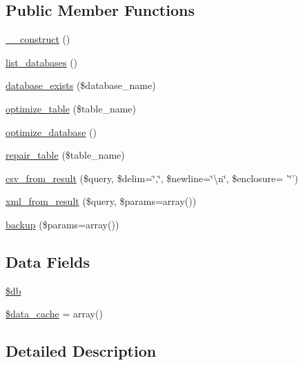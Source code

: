 \subsection*{Public Member Functions}
\begin{DoxyCompactItemize}
\item 
\hyperlink{class_c_i___d_b__utility_a095c5d389db211932136b53f25f39685}{\-\_\-\-\_\-construct} ()
\item 
\hyperlink{class_c_i___d_b__utility_a8486b247a8868504b055622cb2dd34d3}{list\-\_\-databases} ()
\item 
\hyperlink{class_c_i___d_b__utility_ac0ba63aa14b19a37d4773fcc252bde81}{database\-\_\-exists} (\$database\-\_\-name)
\item 
\hyperlink{class_c_i___d_b__utility_a6aed9274f43b64eeee607d172b51529d}{optimize\-\_\-table} (\$table\-\_\-name)
\item 
\hyperlink{class_c_i___d_b__utility_acb26598e177f525b39978f6dfca1f212}{optimize\-\_\-database} ()
\item 
\hyperlink{class_c_i___d_b__utility_a41a627004d26198c69bf466eef7eaeeb}{repair\-\_\-table} (\$table\-\_\-name)
\item 
\hyperlink{class_c_i___d_b__utility_aa5efaa0a8bac872775ec1c8247de4cdf}{csv\-\_\-from\-\_\-result} (\$query, \$delim=\char`\"{},\char`\"{}, \$newline=\char`\"{}\textbackslash{}n\char`\"{}, \$enclosure= '\char`\"{}') 
\item 
\hyperlink{class_c_i___d_b__utility_a09decb7db409060365ad2c20072523f9}{xml\-\_\-from\-\_\-result} (\$query, \$params=array())
\item 
\hyperlink{class_c_i___d_b__utility_abe2b9d47f950dfbaf8c6ec757a9af9a2}{backup} (\$params=array())
\end{DoxyCompactItemize}
\subsection*{Data Fields}
\begin{DoxyCompactItemize}
\item 
\hyperlink{class_c_i___d_b__utility_a1fa3127fc82f96b1436d871ef02be319}{\$db}
\item 
\hyperlink{class_c_i___d_b__utility_aab3007e30adbaf71d06218aa6c90e384}{\$data\-\_\-cache} = array()
\end{DoxyCompactItemize}


\subsection{Detailed Description}


